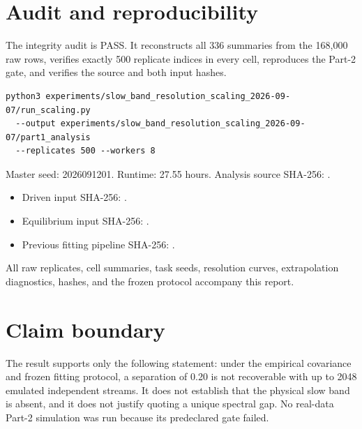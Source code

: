 \documentclass[10pt]{article}
\newcommand{\pass}{\textcolor{green!45!black}{PASS}}
\begin{document}
\section{Audit and reproducibility}
The integrity audit is \pass. It reconstructs all 336 summaries from the 168,000 raw rows, verifies exactly 500 replicate indices in every cell, reproduces the Part-2 gate, and verifies the source and both input hashes.
\begin{verbatim}
python3 experiments/slow_band_resolution_scaling_2026-09-07/run_scaling.py
  --output experiments/slow_band_resolution_scaling_2026-09-07/part1_analysis
  --replicates 500 --workers 8
\end{verbatim}
Master seed: 2026091201. Runtime: 27.55 hours. Analysis source SHA-256: \texttt{}.
\begin{itemize}
\item Driven input SHA-256: \texttt{}.
\item Equilibrium input SHA-256: \texttt{}.
\item Previous fitting pipeline SHA-256: \texttt{}.
\end{itemize}
All raw replicates, cell summaries, task seeds, resolution curves, extrapolation diagnostics, hashes, and the frozen protocol accompany this report.
\section{Claim boundary}
The result supports only the following statement: under the empirical covariance and frozen fitting protocol, a separation of 0.20 is not recoverable with up to 2048 emulated independent streams. It does not establish that the physical slow band is absent, and it does not justify quoting a unique spectral gap. No real-data Part-2 simulation was run because its predeclared gate failed.
\end{document}
